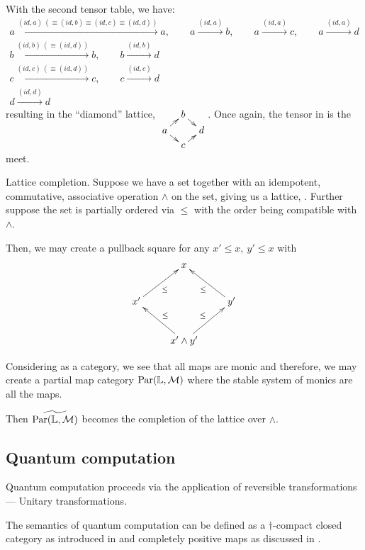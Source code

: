 With the second tensor table, we have:
\begin{align*}
  a \xrightarrow{(id,a) \ (\equiv (id, b) \equiv (id,c) \equiv (id,d))} a, \qquad 
    a \xrightarrow{(id,a)} b, \qquad a \xrightarrow{(id, a)} c , \qquad a \xrightarrow{(id, a)} d \\
  b \xrightarrow{(id,b) \ (\equiv (id, d))} b ,  \qquad b \xrightarrow{(id,b)} d\\
  c \xrightarrow{(id, c) \ (\equiv (id, d))} c,   \qquad c \xrightarrow{(id,c)} d\\
  d \xrightarrow{(id,d)} d
\end{align*}
resulting in the ``diamond'' lattice, 
$
  \xymatrix @R=3pt @C=8pt {
    & b \ar[dr]\\ 
    a \ar[ur] \ar[dr] & &d\\ 
    & c \ar[ur]
  }
$. Once again, the tensor in \D is the meet.

\begin{example}{Lattice completion.}\label{example:lattice_completion}
  Suppose we have a set together with an idempotent, commutative, associative operation $\wedge$ on
  the set, giving us a lattice, \Lat. Further suppose the set is partially ordered via $\le$ with
  the order being compatible with $\wedge$.

  Then, we may create a pullback square for any $x' \le x,\ y' \le x$ with
  \[
    \xymatrix{
      &x\\
      x' \ar[ur]_{\le} & & y' \ar[ul]^{\le}\\
      &x'\wedge y'  \ar[ul]_{\le} \ar[ur]^{\le}
    }
  \]

  Considering \Lat as a category, we see that all maps are monic and therefore, we may create a
  partial map category $\text{Par}(\mathbb{L},\mathcal{M})$ where the stable system of monics are all the maps.

  Then $\widetilde{\text{Par}(\mathbb{L},\mathcal{M})}$ becomes the completion of the lattice over $\wedge$.
\end{example}

\subsection{Quantum computation} %
\label{sub:quantum_computation}

Quantum computation proceeds via the application of reversible transformations --- Unitary
transformations.

The semantics of quantum computation can be defined as a $\dagger$-compact closed category as
introduced in \cite{abramsky02:traces,abramsky05:abstracttraces} and completely positive maps as
discussed in \cite{selinger05:dagger}.


